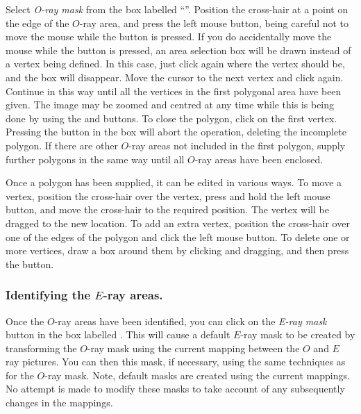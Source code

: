 Select {\em O-ray mask} from the box labelled ``''. Position the cross-hair at a point on the
edge of the $O$-ray area, and press the left mouse button, being careful
not to move the mouse while the button is pressed. If you do accidentally
move the mouse while the button is pressed, an area selection box will be
drawn instead of a vertex being defined. In this case, just click again
where the vertex should be, and the box will disappear. Move the cursor
to the next vertex and click again. Continue in this way until all the
vertices in the first polygonal area have been given. The image may be
zoomed and centred at any time while this is being done by using the
 and 
buttons. To close the polygon, click on the first vertex. Pressing the
 button in the  box will abort the operation,
deleting the incomplete polygon. If there are other $O$-ray areas not
included in the first polygon, supply further polygons in the same way
until all $O$-ray areas have been enclosed.

Once a polygon has been supplied, it can be edited in various ways. To
move a vertex, position the cross-hair over the vertex, press and hold
the left mouse button, and move the cross-hair to the required position.
The vertex will be dragged to the new location. To add an extra vertex,
position the cross-hair over one of the edges of the polygon and click
the left mouse button. To delete one or more vertices, draw a box around 
them by clicking and dragging, and then press the  button.

\subsubsection {Identifying the $E$-ray areas.}
Once the $O$-ray areas have been identified, you can click on the {\em
E-ray mask} button in the box labelled . This will cause a default $E$-ray mask to be
created by transforming the $O$-ray mask using the current mapping
between the $O$ and $E$ ray pictures. You can then
 this mask, if necessary, using the
same techniques as for the $O$-ray mask. Note, default masks are created
using the current mappings. No attempt is made to modify these masks to
take account of any subsequently changes in the mappings.


